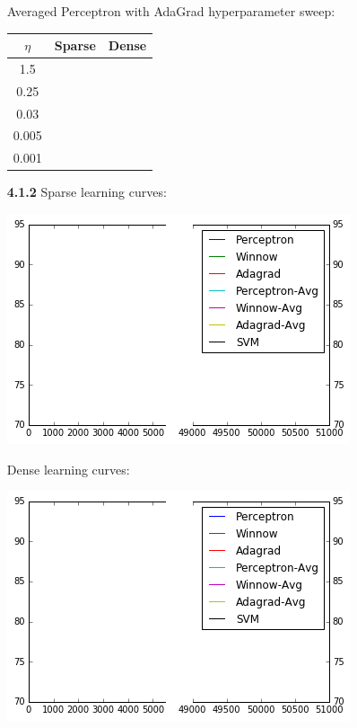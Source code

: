 \documentclass{article}
\begin{document}
\begin{enumerate}
    Averaged Perceptron with AdaGrad hyperparameter sweep:
    \begin{center}
        \begin{tabular}{|c|c|c|}
            \hline
            $\eta$ & Sparse & Dense \\
            \hline
            1.5 & & \\
            0.25 & & \\
            0.03 & & \\
            0.005 & & \\
            0.001 & & \\
            \hline
        \end{tabular}
    \end{center}

    \item[\textbf{4.1.2}]
    Sparse learning curves:
    \begin{center}
        \includegraphics[]{sample.png}
    \end{center}

    Dense learning curves:
    \begin{center}
        \includegraphics[]{sample.png}
    \end{center}


\end{enumerate}
\end{document}
